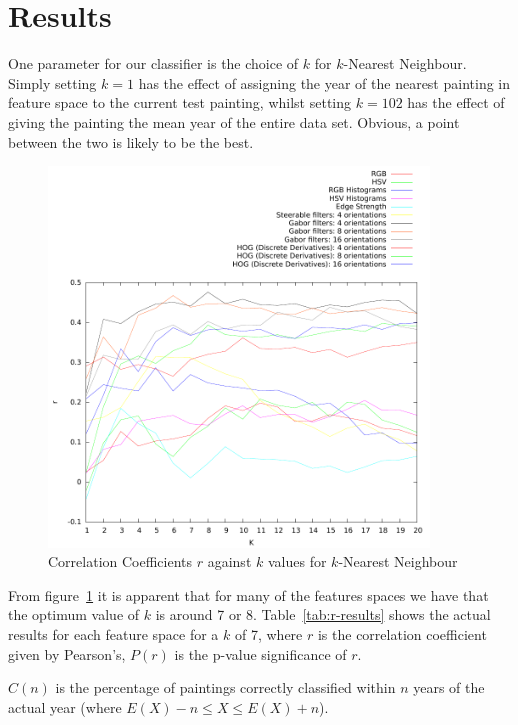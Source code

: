 \section{Results}

One parameter for our classifier is the choice of $k$ for $k$-Nearest Neighbour. Simply setting 
$k=1$ has the effect of assigning the year of the nearest painting in feature space to the current
test painting, whilst setting $k=102$ has the effect of giving the painting the mean year of the 
entire data set. Obvious, a point between the two is likely to be the best. 

\begin{figure}[h]
\centering
\includegraphics[width=0.9\textwidth]{../../isispa-paper/results/mean}
\caption{Correlation Coefficients $r$ against $k$ values for $k$-Nearest Neighbour}\label{fig:r-graph}
\end{figure}

From figure~\ref{fig:r-graph} it is apparent that for many of the features spaces we have that the 
optimum value of $k$ is around 7 or 8. Table~\ref{tab:r-results} shows the actual results for each 
feature space for a $k$ of 7, where $r$ is the correlation coefficient given by Pearson's, 
$P(r)$ is the p-value significance of $r$.

$C(n)$ is the percentage of paintings correctly classified within $n$ years of the actual year 
(where $E(X)-n \le X \le E(X)+n$).

